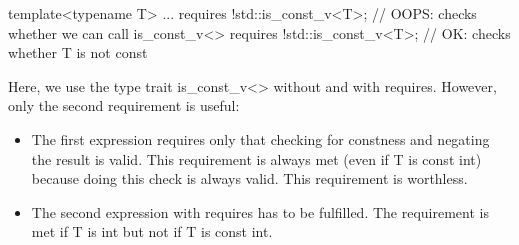 \begin{cpp}
template<typename T>
... requires {
	!std::is_const_v<T>; // OOPS: checks whether we can call is_const_v<>
	requires !std::is_const_v<T>; // OK: checks whether T is not const
}
\end{cpp}

Here, we use the type trait is\_const\_v<> without and with requires. However, only the second requirement is useful:

\begin{itemize}
\item
The first expression requires only that checking for constness and negating the result is valid. This requirement is always met (even if T is const int) because doing this check is always valid. This requirement is worthless.

\item
The second expression with requires has to be fulfilled. The requirement is met if T is int but not if T is const int.
\end{itemize}

